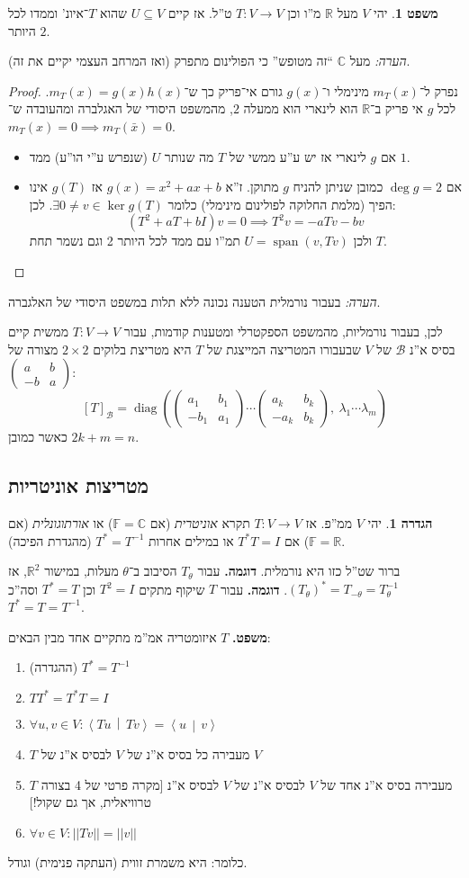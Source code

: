 \documentclass[a4paper]{article}
\newcommand\R     {\mathbb{R}}
\newcommand\C     {\mathbb{C}}
\newcommand\bc    {\mathcal{B}}
\newcommand\ra    {\rangle}
\newcommand\la    {\langle}
\DeclareMathOperator{\diag}    {diag}
\DeclareMathOperator{\Sp}      {span}
\newcommand\F         {\mathbb{F}}
\newcommand\co        {\colon}
\newcommand\pms[1]    {\begin{pmatrix}
		#1
\end{pmatrix}}
\newcommand\norm[1]   {\left \vert \left \vert #1 \right \vert \right \vert}
\newcommand\mut [2]   {\left \la #1 \,\middle\vert\, #2 \right \ra}
\newcommand\tg        {\theta}
\renewcommand\lg      {\lambda}
\newcommand\op    {^{-1}}
\newcommand\cl [1]    {\left ( #1 \right )}
\theoremstyle{definition}
\newtheorem{Theorem}{\color{myblue}משפט}
\newtheorem{Definition}{\color{mygreen}הגדרה}
\newcommand\theo  [1] {\begin{Theorem}#1\end{Theorem}}
\newcommand\defi  [1] {\begin{Definition}#1\end{Definition}}
\begin{document}
	\theo{יהי $V$ מעל $\R$ מ''ו וכן $T \co V \to V$ ט''ל. אז קיים $U \subseteq V$ שהוא $T$־איונ' וממדו לכל היותר $2$. }
	\textit{הערה: }מעל $\C$ ``זה מטופש'' כי הפולינום מתפרק (ואז המרחב העצמי יקיים את זה). 
	\begin{proof}
		נפרק ל־$m_T(x)$ מינימלי ו־$g(x)$ גורם אי־פריק כך ש־$m_T(x) = g(x)h(x)$. לכל $g$ אי פריק ב־$\R$ הוא לינארי  הוא ממעלה $2$, מהמשפט היסודי של האגלברה ומהעובדה ש־$m_T(x) = 0 \implies m_T(\bar x) = 0$. 
		\begin{itemize}
			\item אם $g$ לינארי אז יש ע''ע ממשי של $T$ מה שנותר $U$ (שנפרש ע''י הו''ע) ממד $1$. 
			\item אם $\deg g = 2$ כמובן שניתן להניח $g$ מתוקן. ז''א $g(x) = x^2 + ax + b$ אז $g(T)$ אינו הפיך (מלמת החלוקה לפולינום מינימלי) כלומר $\exists 0 \neq v \in \ker g(T)$. 
			לכן: 
			\[ (T^2 + aT + bI)v = 0 \implies T^2v = -a T v - bv \]
			ולכן $U = \Sp(v, Tv)$ תמ''ו עם ממד לכל היותר 2 וגם נשמר תחת $T$. 
		\end{itemize}
	\end{proof}
	
	\textit{הערה: }בעבור נורמלית הטענה נכונה ללא תלות במשפט היסודי של האלגברה. 
	
	לכן, בעבור נורמליות, מהמשפט הספקטרלי ומטענות קודמות, עבור $T \co V \to V$ ממשית קיים בסיס א''נ $\bc$ של $V$ שבעבורו המטריצה המייצגת של $T$ היא מטריצת בלוקים $2 \times 2$ מצורה של $\pms{a & b \\ -b & a}$: 
	\[ [T]_\bc = \diag\cl{\pms{a_1 & b_1 \\ -b_1 & a_1} \cdots \pms{a_k & b_k \\ -a_k & b_k}, \ \lg_1 \cdots \lg_m} \]
	כאשר כמובן $2k + m = n$. 
	
	
	
	\subsection{מטריצות אוניטריות}
	\defi{יהי $V$ ממ''פ. אז $T \co V \to V$ תקרא \textit{אוניטרית} (אם $\F = \C$) או \textit{אורתוגונלית} (אם $\F = \R$) אם $T^*T = I$ או במילים אחרות $T^* = T\op$ (מהגדרת הפיכה). }
	ברור שט''ל כזו היא נורמלית. 
	\textbf{דוגמה. }עבור $T_\tg$ הסיבוב ב־$\tg$ מעלות, במישור $\R^2$, אז $(T_\tg)^* = T_{-\tg} = T\op_{\tg}$.  
	\textbf{דוגמה. }עבור $T$ שיקוף מתקים $T^2 = I$ וכן $T^* = T$ וסה''כ $T^* = T = T\op$. 

	\textbf{משפט. }$T$ איזומטריה אמ''מ מתקיים אחד מבין הבאים: 
	\begin{enumerate}
		\item (ההגדרה) \hfil $T^* = T\op$
		\item \hfil $TT^* = T^*T = I$
		\item \hfil $\forall u, v \in V \co \mut{Tu}{Tv} = \mut{u}{v}$
		\item $T$ מעבירה כל בסיס א''נ של $V$ לבסיס א''נ של $V$
		\item $T$ מעבירה בסיס א''נ אחד של $V$ לבסיס א''נ של $V$ לבסיס א''נ [מקרה פרטי של 4 בצורה טרוויאלית, אך גם שקול!]
		\item \hfil $\forall v \in V \co \norm{Tv} = \norm{v}$
	\end{enumerate}
	כלומר: היא משמרת זווית (העתקה פנימית) וגודל. 
	
\end{document}
